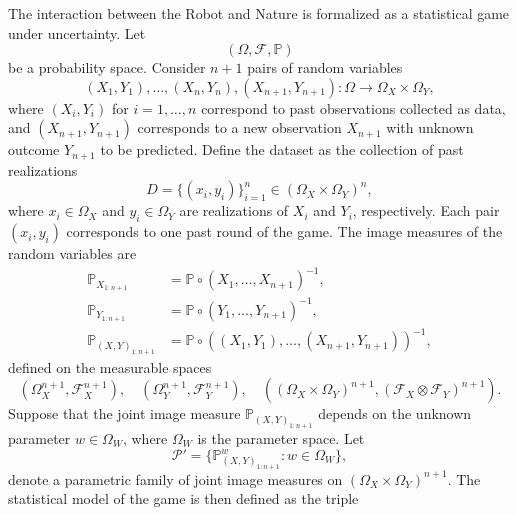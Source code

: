 \begin{definition}
	\label{def:statistical_game}
	The interaction between the Robot and Nature is formalized as a statistical game under uncertainty. Let
	\begin{equation}
		(\Omega, \mathcal{F}, \mathbb{P})
	\end{equation}
	be a probability space. Consider $n+1$ pairs of random variables
	\begin{equation}
		(X_1, Y_1), \dots, (X_n, Y_n), (X_{n+1}, Y_{n+1}) \colon \Omega \to \Omega_X \times \Omega_Y,
	\end{equation}
	where $(X_i,Y_i)$ for $i=1,\dots,n$ correspond to past observations collected as data, and $(X_{n+1},Y_{n+1})$ corresponds to a new observation $X_{n+1}$ with unknown outcome $Y_{n+1}$ to be predicted. Define the dataset as the collection of past realizations
	\begin{equation}
		D = \{(x_i, y_i)\}_{i=1}^n \in (\Omega_X \times \Omega_Y)^n,
	\end{equation}
	where $x_i \in \Omega_X$ and $y_i \in \Omega_Y$ are realizations of $X_i$ and $Y_i$, respectively. Each pair $(x_i, y_i)$ corresponds to one past round of the game. The image measures of the random variables are
	\begin{equation}
		\begin{split}
			\mathbb{P}_{X_{1:n+1}} &= \mathbb{P} \circ (X_1,\dots,X_{n+1})^{-1},\\
			\mathbb{P}_{Y_{1:n+1}} &= \mathbb{P} \circ (Y_1,\dots,Y_{n+1})^{-1},\\
			\mathbb{P}_{(X,Y)_{1:n+1}} &= \mathbb{P} \circ ((X_1,Y_1),\dots,(X_{n+1},Y_{n+1}))^{-1},
		\end{split}
	\end{equation}
	defined on the measurable spaces
	\begin{equation}
		(\Omega_X^{n+1},\mathcal{F}_X^{n+1}), \quad(\Omega_Y^{n+1},\mathcal{F}_Y^{n+1}), \quad ((\Omega_X \times \Omega_Y)^{n+1}, (\mathcal{F}_X \otimes \mathcal{F}_Y)^{n+1}).
	\end{equation}
	Suppose that the joint image measure $\mathbb{P}_{(X,Y)_{1:n+1}}$ depends on the unknown parameter $w \in \Omega_W$, where $\Omega_W$ is the parameter space. Let
	\begin{equation}
		\mathcal{P}' = \{ \mathbb{P}^w_{(X,Y)_{1:n+1}} \colon w \in \Omega_W \},
	\end{equation}
	denote a parametric family of joint image measures on $(\Omega_X \times \Omega_Y)^{n+1}$. The statistical model of the game is then defined as the triple

\end{definition}
